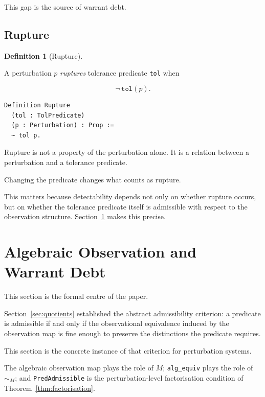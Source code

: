 \documentclass[12pt]{article}
\theoremstyle{plain}
\theoremstyle{definition}
\newtheorem{definition}[theorem]{Definition}
\theoremstyle{remark}
\begin{document}
This gap is the source of warrant debt.

\subsection{Rupture}

\begin{definition}[Rupture]
\label{def:rupture}

A perturbation $p$ \emph{ruptures} tolerance predicate
\texttt{tol} when

\[
\neg\,\mathtt{tol}(p).
\]

\end{definition}

\begin{lstlisting}[style=rocq,
caption={Rupture.}]
Definition Rupture
  (tol : TolPredicate)
  (p : Perturbation) : Prop :=
  ~ tol p.
\end{lstlisting}

Rupture is not a property of the perturbation alone.
It is a relation between a perturbation and a tolerance predicate.

Changing the predicate changes what counts as rupture.

This matters because detectability depends not only on whether rupture
occurs, but on whether the tolerance predicate itself is admissible
with respect to the observation structure.
Section~\ref{sec:warrant} makes this precise.

\section{Algebraic Observation and Warrant Debt}
\label{sec:warrant}

This section is the formal centre of the paper.

Section~\ref{sec:quotients} established the abstract admissibility
criterion: a predicate is admissible if and only if the observational
equivalence induced by the observation map is fine enough to preserve
the distinctions the predicate requires.

This section is the concrete instance of that criterion for
perturbation systems.

The algebraic observation map plays the role of $M$; \texttt{alg\_equiv}
plays the role of $\sim_M$; and \texttt{PredAdmissible} is the
perturbation-level factorisation condition of
Theorem~\ref{thm:factorisation}.
\end{document}
